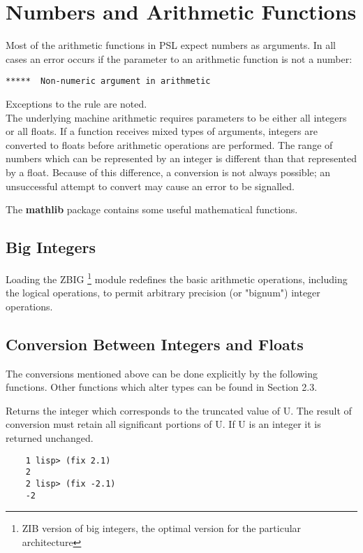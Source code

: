 \section{Numbers and Arithmetic Functions}

Most  of  the  arithmetic  functions  in PSL expect numbers as
arguments.    In all  cases an error occurs  if the parameter to
an arithmetic function is not a number:

\begin{verbatim}
*****  Non-numeric argument in arithmetic
\end{verbatim}
Exceptions to the rule are noted.\\

\noindent
The underlying machine arithmetic requires  parameters  to  be
either all integers or all floats.  If a function receives mixed
types  of  arguments,  integers  are  converted to floats before
arithmetic operations are performed.  The range of numbers which
can  be  represented  by  an  integer  is  different  than  that
represented   by  a  float.    Because  of  this  difference,  a
conversion is not always possible; an  unsuccessful  attempt  to
convert may cause an error to be signalled.

\noindent
The {\bf mathlib} package contains some useful mathematical functions. 

\subsection{Big Integers}

  Loading  the  ZBIG \footnote{ZIB version of big integers, the
optimal version for the particular architecture }
  module  redefines  the   basic   arithmetic
operations,   including   the   logical  operations,  to  permit
arbitrary precision (or "bignum") integer operations.

\subsection{Conversion Between Integers and Floats}

  The conversions mentioned above can be done explicitly by  the
following  functions.   Other functions which alter types can be
found in Section 2.3.


{    Returns the integer which corresponds to the truncated value
    of U.  The result of conversion must retain all  significant
    portions of U.  If U is an integer it is returned unchanged.
}
\begin{verbatim}
    1 lisp> (fix 2.1)
    2
    2 lisp> (fix -2.1)
    -2
\end{verbatim}

